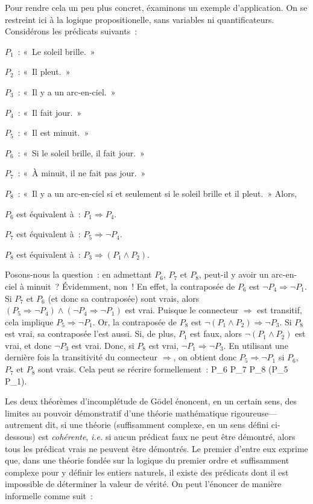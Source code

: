 Pour rendre cela un peu plus concret, éxaminons un exemple d'application. 
On se restreint ici à la logique propositionelle, sans variables ni quantificateurs. 
Considérons les prédicats suivants : 
\startitemize[nowhite]
  \item $P_1$ : « Le soleil brille. »
  \item $P_2$ : « Il pleut. »
  \item $P_3$ : « Il y a un arc-en-ciel. »
  \item $P_4$ : « Il fait jour. »
  \item $P_5$ : « Il est minuit. »
  \item $P_6$ : « Si le soleil brille, il fait jour. »
  \item $P_7$ : « À minuit, il ne fait pas jour. »
  \item $P_8$ : « Il y a un arc-en-ciel si et seulement si le soleil brille et il pleut. »
\stopitemize
Alors, 
\startitemize[nowhite]
  \item $P_6$ est équivalent à : $P_1 \Rightarrow P_4$.
  \item $P_7$ est équivalent à : $P_5 \Rightarrow \lnot P_4$.
  \item $P_8$ est équivalent à : $P_3 \Rightarrow (P_1 \wedge P_2)$.
\stopitemize

Posons-nous la question : en admettant $P_6$, $P_7$ et $P_8$, peut-il y avoir un arc-en-ciel à minuit ? 
Évidemment, non ! 
En effet, la contraposée de $P_6$ est $\lnot  P_4 \Rightarrow \lnot P_1$. 
Si $P_7$ et $P_6$ (et donc sa contraposée) sont vrais, alors $(P_5 \Rightarrow \lnot P_4) \wedge (\lnot  P_4 \Rightarrow \lnot P_1)$ est vrai. 
Puisque le connecteur $\Rightarrow$ est transitif, cela implique $P_5 \Rightarrow \lnot P_1$. 
Or, la contraposée de $P_8$ est $\lnot (P_1 \wedge P_2) \Rightarrow \lnot P_3$. 
Si $P_8$ est vrai, sa contraposée l'est aussi. 
Si, de plus, $P_1$ est faux, alors $\lnot (P_1 \wedge P_2)$ est vrai, et donc $\lnot P_3$ est vrai. 
Donc, si $P_8$ est vrai, $\lnot P_1 \Rightarrow \lnot P_3$. 
En utilisant une dernière fois la transitivité du connecteur $\Rightarrow$, on obtient donc $P_5 \Rightarrow \lnot P_1$ si $P_6$, $P_7$ et $P_8$ sont vrais. 
Cela peut se récrire formellement : 
\startformula
    P_6 \wedge P_7 \wedge P_8 \Rightarrow (P_5 \Rightarrow \lnot P_1). 
\stopformula

\stopsubsection

\startsubsection[title=Premier théorème d'incomplétude de Gödel]

Les deux théorèmes d'incomplétude de Gödel énoncent, en un certain sens, des limites au pouvoir démonstratif d'une théorie mathématique rigoureuse—autrement dit, si une théorie (suffisamment complexe, en un sens défini ci-dessous) est \emph{cohérente}, \emph{i.e.} si aucun prédicat faux ne peut être démontré, alors tous les prédicat vrais ne peuvent être démontrés. 
Le premier d'entre eux exprime que, dans une théorie fondée sur la logique du premier ordre et suffisamment complexe pour y définir les entiers naturels, il existe des prédicats dont il est impossible de déterminer la valeur de vérité.
On peut l'énoncer de manière informelle comme suit : 

